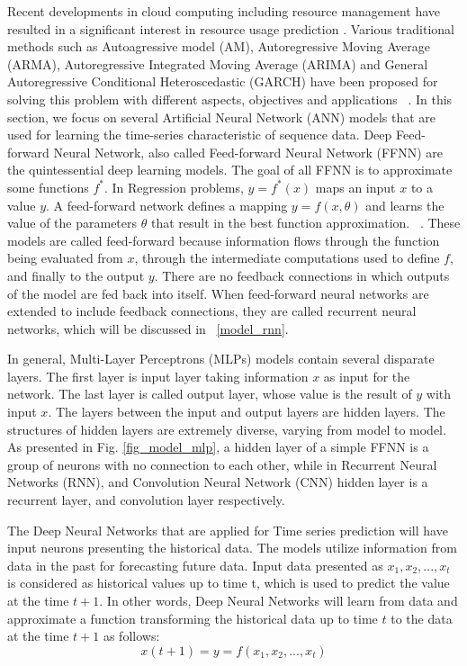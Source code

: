 \documentclass[../main.tex]{subfiles}
\begin{document}
	Recent developments in cloud computing including resource management have resulted in a significant interest in resource usage prediction . Various traditional methods such as Autoagressive model (AM), Autoregressive Moving Average (ARMA), Autoregressive Integrated Moving Average (ARIMA) and General Autoregressive Conditional Heteroscedastic (GARCH) have been proposed for solving this problem with different aspects, objectives and applications ~\cite{amiri2017survey}. In this section, we focus on several Artificial Neural Network (ANN) models that are used for learning the time-series characteristic of sequence data.
	Deep Feed-forward Neural Network, also called Feed-forward Neural Network (FFNN) are the quintessential deep learning models. The goal of all FFNN is to approximate some functions $f^*$.  In Regression problems, $y = f^*(x)$ maps an input $x$ to a value $y$. A feed-forward network defines a mapping $y = f(x,\theta)$ and learns the value of the parameters $\theta$ that result in the best function approximation. ~\cite{Goodfellow-et-al-2016}. These models are called feed-forward because information flows through the function being evaluated from $x$, through the intermediate computations used to define $f$, and finally to the output $y$. There are no feedback connections in which outputs of the model are fed back into itself. When feed-forward neural networks are extended to include feedback connections, they are called recurrent neural networks, which will be discussed in ~\ref{model_rnn}.
	
	In general, Multi-Layer Perceptrons (MLPs) models contain several disparate layers. The first layer is input layer taking information $x$ as input for the network. The last layer is called output layer, whose value is the result of $y$ with input $x$. The layers between the input and output layers are hidden layers. The structures of hidden layers are extremely diverse, varying from model to model. As presented in Fig. \ref{fig_model_mlp}, a hidden layer of a simple FFNN is a group of neurons with no connection to each other, while in Recurrent Neural Networks (RNN), and Convolution Neural Network (CNN) hidden layer is a recurrent layer, and convolution layer respectively. 
	
	The Deep Neural Networks that are applied for Time series prediction will have input neurons presenting the historical data. The models utilize information from data in the past for forecasting future data. Input data presented as $x_1, x_2, ..., x_t$ is considered as historical values up to time t, which is used to predict the value at the time $t+1$. In other words, Deep Neural Networks will learn from data and approximate a function transforming the historical data up to time $t$ to the data at the time $t+1$ as follows:
\begin{equation} \label{eq_ffnn_1}
x(t+1) = y = f(x_1, x_2, ..., x_t)
\end{equation}
	
\end{document}
